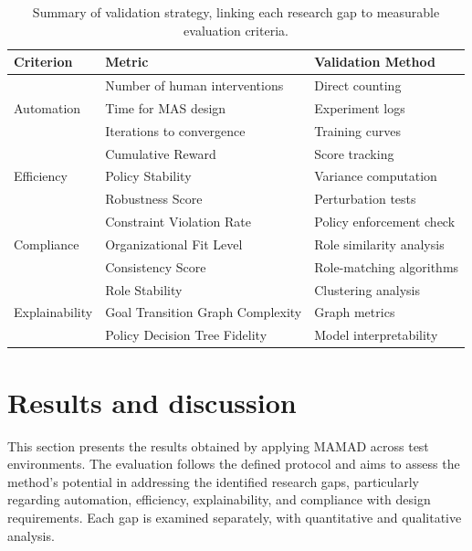 \documentclass[pdflatex,sn-mathphys-num]{sn-jnl}%
\theoremstyle{thmstyleone}%
\theoremstyle{thmstyletwo}%
\theoremstyle{thmstylethree}%
\begin{document}
\begin{table}[h!]
    \centering
    \begin{tabular}{|l|l|l|}
        \hline
        \textbf{Criterion} & \textbf{Metric} & \textbf{Validation Method} \\
        \hline
        \multirow{3}{*}{Automation} & Number of human interventions & Direct counting \\
                                    & Time for MAS design & Experiment logs \\
                                    & Iterations to convergence & Training curves \\
        \hline
        \multirow{3}{*}{Efficiency} & Cumulative Reward & Score tracking \\
                                    & Policy Stability & Variance computation \\
                                    & Robustness Score & Perturbation tests \\
        \hline
        \multirow{3}{*}{Compliance} & Constraint Violation Rate & Policy enforcement check \\
                                    & Organizational Fit Level & Role similarity analysis \\
                                    & Consistency Score & Role-matching algorithms \\
        \hline
        \multirow{3}{*}{Explainability} & Role Stability & Clustering analysis \\
                                        & Goal Transition Graph Complexity & Graph metrics \\
                                        & Policy Decision Tree Fidelity & Model interpretability \\
        \hline
    \end{tabular}
    \caption{Summary of validation strategy, linking each research gap to measurable evaluation criteria.}
\end{table}

\clearpage

\section{Results and discussion} \label{sec:results}

This section presents the results obtained by applying MAMAD across test environments. The evaluation follows the defined protocol and aims to assess the method's potential in addressing the identified research gaps, particularly regarding automation, efficiency, explainability, and compliance with design requirements. Each gap is examined separately, with quantitative and qualitative analysis.
\end{document}
